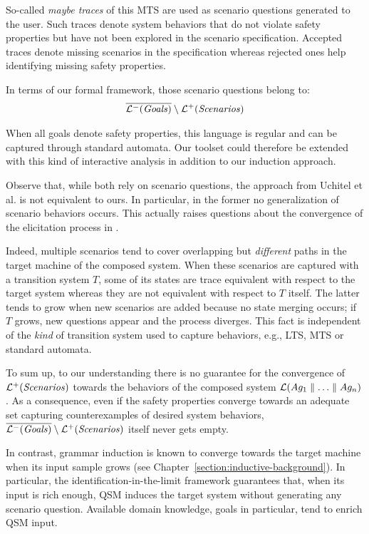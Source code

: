 So-called \emph{maybe traces} of this MTS are used as scenario questions generated to the user. Such traces denote system behaviors that do not violate safety properties but have not been explored in the scenario specification. Accepted traces denote missing scenarios in the specification whereas rejected ones help identifying missing safety properties. 

In terms of our formal framework, those scenario questions belong to:
\begin{align*}
\overline{\mathcal{L}^-(\mbox{\emph{Goals}})} \setminus \mathcal{L}^+(\mbox{\emph{Scenarios}})
\end{align*}

When all goals denote safety properties, this language is regular and can be captured through standard automata. Our toolset could therefore be extended with this kind of interactive analysis in addition to our induction approach.

Observe that, while both rely on scenario questions, the approach from Uchitel et al. is not equivalent to ours. In particular, in the former no generalization of scenario behaviors occurs. This actually raises questions about the convergence of the elicitation process in \cite{Uchitel:2007, Uchitel:2009}. 

Indeed, multiple scenarios tend to cover overlapping but \emph{different} paths in the target machine of the composed system. When these scenarios are captured with a transition system $T$, some of its states are trace equivalent with respect to the target system whereas they are not equivalent with respect to $T$ itself. The latter tends to grow when new scenarios are added because no state merging occurs; if $T$ grows, new questions appear and the process diverges. 
This fact is independent of the \emph{kind} of transition system used to capture behaviors, e.g., LTS, MTS or standard automata. 

To sum up, to our understanding there is no guarantee for the convergence of $\mathcal{L}^+(\mbox{\emph{Scenarios}})$ towards the behaviors of the composed system $\mathcal{L}(Ag_1 \parallel \ldots \parallel Ag_n)$. As a consequence, even if the safety properties converge towards an adequate set capturing counterexamples of desired system behaviors, $\overline{\mathcal{L}^-(\mbox{\emph{Goals}})} \setminus \mathcal{L}^+(\mbox{\emph{Scenarios}})$ itself never gets empty.

In contrast, grammar induction is known to converge towards the target machine when its input sample grows \cite{Oncina:1993} (see Chapter~\ref{section:inductive-background}). In particular, the identification-in-the-limit framework guarantees that, when its input is rich enough, QSM induces the target system without generating any scenario question. Available domain knowledge, goals in particular, tend to enrich QSM input.

